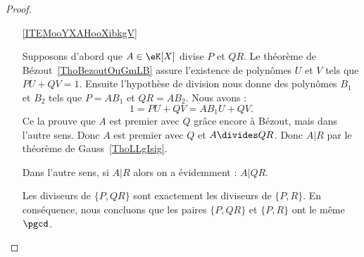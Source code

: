 \begin{proof}
\begin{enumerate}

\item[\ref{ITEMooYXAHooXibkgV}]

Supposons d'abord que \( A\in \eK[X]\) divise \( P\) et \( QR\). Le théorème de Bézout~\ref{ThoBezoutOuGmLB} assure l'existence de polynômes $U$ et $V$ tels que $PU+QV=1$. Ensuite l'hypothèse de division nous donne des polynômes \( B_1\) et \( B_2\) tels que $P=AB_1$ et $QR=AB_2$.  Nous avons :
            \begin{equation}
                    1=PU+QV=AB_1U+QV.
            \end{equation}
            Ce la prouve que \( A\) est premier avec $Q$ grâce encore à Bézout, mais dans l'autre sens. Donc \( A\) est premier avec \( Q\) et \( A\divides QR\). Donc \( A|R\) par le théorème de Gauss~\ref{ThoLLgIsig}.

    Dans l'autre sens, si $A|R$ alors on a évidemment : $A|QR$.

    Les diviseurs de $\{P,QR\}$ sont exactement les diviseurs de $\{P,R\}$. En conséquence, nous concluons que les paires $\{P,QR\}$ et $\{P,R\}$ ont le même $\pgcd$.

    \end{enumerate}

\end{proof}


